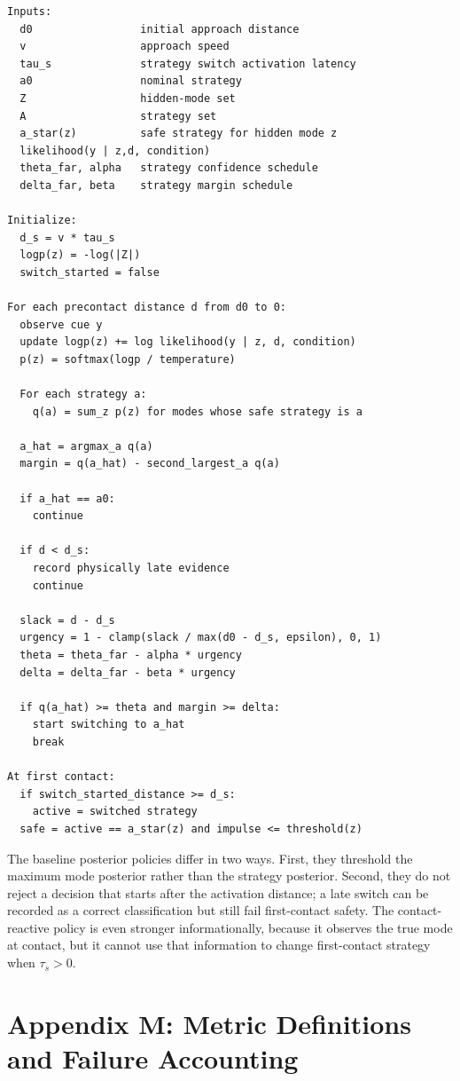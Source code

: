 \documentclass{article}
\begin{document}
\begin{verbatim}
Inputs:
  d0                 initial approach distance
  v                  approach speed
  tau_s              strategy switch activation latency
  a0                 nominal strategy
  Z                  hidden-mode set
  A                  strategy set
  a_star(z)          safe strategy for hidden mode z
  likelihood(y | z,d, condition)
  theta_far, alpha   strategy confidence schedule
  delta_far, beta    strategy margin schedule

Initialize:
  d_s = v * tau_s
  logp(z) = -log(|Z|)
  switch_started = false

For each precontact distance d from d0 to 0:
  observe cue y
  update logp(z) += log likelihood(y | z, d, condition)
  p(z) = softmax(logp / temperature)

  For each strategy a:
    q(a) = sum_z p(z) for modes whose safe strategy is a

  a_hat = argmax_a q(a)
  margin = q(a_hat) - second_largest_a q(a)

  if a_hat == a0:
    continue

  if d < d_s:
    record physically late evidence
    continue

  slack = d - d_s
  urgency = 1 - clamp(slack / max(d0 - d_s, epsilon), 0, 1)
  theta = theta_far - alpha * urgency
  delta = delta_far - beta * urgency

  if q(a_hat) >= theta and margin >= delta:
    start switching to a_hat
    break

At first contact:
  if switch_started_distance >= d_s:
    active = switched strategy
  safe = active == a_star(z) and impulse <= threshold(z)
\end{verbatim}

The baseline posterior policies differ in two ways. First, they threshold the maximum mode posterior rather than the strategy posterior. Second, they do not reject a decision that starts after the activation distance; a late switch can be recorded as a correct classification but still fail first-contact safety. The contact-reactive policy is even stronger informationally, because it observes the true mode at contact, but it cannot use that information to change first-contact strategy when $\tau_s>0$.

\section{Appendix M: Metric Definitions and Failure Accounting}
\end{document}

